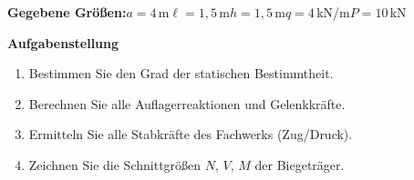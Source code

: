 \documentclass[a4paper,11pt]{article}
\begin{document}
\textbf{Gegebene Größen:}\quad $a=4$\,m\quad $\ell=1,5$\,m\quad $h=1,5$\,m\quad $q=4$\,kN/m\quad $P=10$\,kN
\par\medskip
\textbf{Aufgabenstellung}\par
\begin{enumerate}[label=\textbf{\arabic*.}]
  \item Bestimmen Sie den Grad der statischen Bestimmtheit.
  \item Berechnen Sie alle Auflagerreaktionen und Gelenkkräfte.
  \item Ermitteln Sie alle Stabkräfte des Fachwerks (Zug/Druck).
  \item Zeichnen Sie die Schnittgrößen $N$, $V$, $M$ der Biegeträger.
\end{enumerate}
\end{document}
